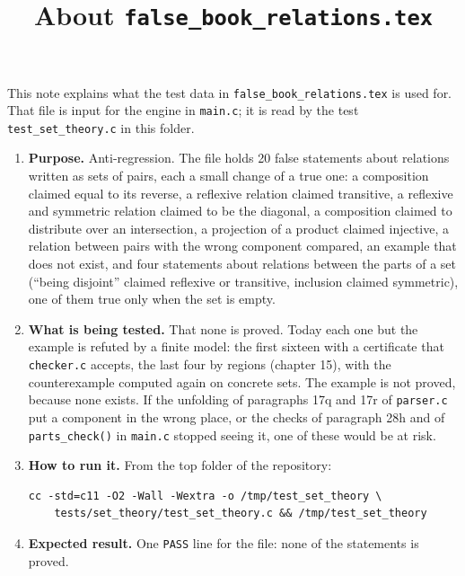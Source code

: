 \documentclass[11pt,a4paper]{article}
\title{About \texttt{false\_book\_relations.tex}}
\author{}
\date{}
\begin{document}
\maketitle
This note explains what the test data in \texttt{false\_book\_relations.tex} is used for. That file is input for the engine in \texttt{main.c}; it is read by the test \texttt{test\_set\_theory.c} in this folder.

\begin{enumerate}
\item \textbf{Purpose.} Anti-regression. The file holds 20 false statements about relations written as sets of pairs, each a small change of a true one: a composition claimed equal to its reverse, a reflexive relation claimed transitive, a reflexive and symmetric relation claimed to be the diagonal, a composition claimed to distribute over an intersection, a projection of a product claimed injective, a relation between pairs with the wrong component compared, an example that does not exist, and four statements about relations between the parts of a set (``being disjoint'' claimed reflexive or transitive, inclusion claimed symmetric), one of them true only when the set is empty.

\item \textbf{What is being tested.} That none is proved. Today each one but the example is refuted by a finite model: the first sixteen with a certificate that \texttt{checker.c} accepts, the last four by regions (chapter 15), with the counterexample computed again on concrete sets. The example is not proved, because none exists. If the unfolding of paragraphs 17q and 17r of \texttt{parser.c} put a component in the wrong place, or the checks of paragraph 28h and of \texttt{parts\_check()} in \texttt{main.c} stopped seeing it, one of these would be at risk.

\item \textbf{How to run it.} From the top folder of the repository:
\begin{verbatim}
cc -std=c11 -O2 -Wall -Wextra -o /tmp/test_set_theory \
    tests/set_theory/test_set_theory.c && /tmp/test_set_theory
\end{verbatim}

\item \textbf{Expected result.} One \texttt{PASS} line for the file: none of the statements is proved.
\end{enumerate}
\end{document}
